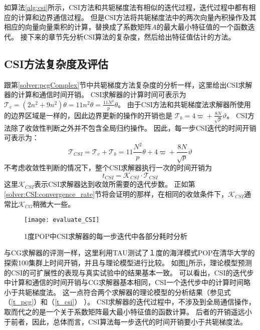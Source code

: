 如算法\ref{alg:csi}所示，CSI方法和共轭梯度法有相似的迭代过程，迭代过程中都有相应的计算和边界通信过程。
但是CSI方法将共轭梯度法中的两次向量內积操作及其相应的向量向量乘积的计算，替换成了系数矩阵$A$的最大最小特征值的一个函数迭代。 接下来的章节先分析CSI算法的复杂度，然后给出特征值估计的方法。

\subsection{CSI方法复杂度及评估} \label{solver:Algorithm:complex}

跟第\ref{solver:pcgComplex}节中共轭梯度方法复杂度的分析一样，这里给出CSI求解器的计算和通信时间开销。
CSI求解器的计算时间可表示为
$\mathcal{T}_c =  (2 n^2 + 9n^2)\theta = 11n^2\theta =\frac{11N^2}{p}\theta$。 
由于CSI方法和共轭梯度法求解器所使用的边界区域是一样的，因此边界更新的操作的开销也是 $\mathcal{T}_b =4\varpi + \frac{8N}{\sqrt{p}}\vartheta$。 CSI方法除了收敛性判断之外并不包含全局归约操作。 
因此，每一步CSI迭代的时间开销可表示为： 　
\begin{equation}
\label{t_csi}
\mathcal{T}_{CSI} = \mathcal{T}_c + \mathcal{T}_b
= 11\frac{N^2}{p}\theta + 4\varpi + \frac{8N}{\sqrt{p}}\vartheta
\end{equation}
不考虑收敛性判断的情况下，整个CSI求解器执行一次的时间开销为
\begin{equation}
\label{t_csi_all}
t_{CSI} = \mathcal{K}_{CSI}\cdot \mathcal{T}_{CSI}
\end{equation}
这里$\mathcal{K}_{CSI}$表示CSI求解器达到收敛所需要的迭代步数。
正如第\ref{solver:CSI:convergence_rate}节将会证明的那样，在相同的收敛条件下，$\mathcal{K}_{CSI}$通常比$\mathcal{K}_{CG}$稍微大一些。



\begin {figure}[ht]
\centering
\texttt{[image: evaluate\_CSI]}
\caption[] { 1度POP中CSI求解器的每一步迭代中各部分耗时分析}
\label{fig:cst_ratio}
\end{figure}
与CG求解器的评测一样，这里利用TAU测试了１度的海洋模式POP在清华大学的探索100集群上时间开销，并且与理论模型进行比较。
如图\ref{fig:cst_ratio}所示，理论模型预测的CSI的可扩展性的表现与真实试验中的结果基本一致。
可以看出，CSI的迭代步中计算和通信的时间开销与CG求解器基本相同，CSI一个迭代步中的计算时间略小于共轭梯度法。
这一点符合两个求解器的理论模型的分析结果（参见式（\ref{t_pcg}）和（\ref{t_csi}） ）。
CSI求解器的迭代过程中，不涉及到全局通信操作，取而代之的是一个关于系数矩阵最大最小特征值的函数计算。
后者的开销遥远小于前者，因此，总体而言，CSI算法每一步迭代的时间开销要小于共轭梯度法。 

